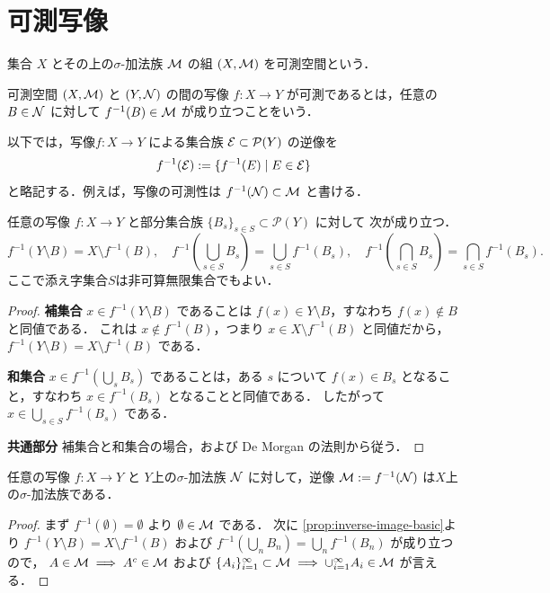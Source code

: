 \section{可測写像}

\begin{definition}[可測空間]\label{def:measurable-space}
集合 $X$ とその上の$\sigma$-加法族 $\mathcal M$ の組
$(X,\mathcal M)$
を可測空間という．
\end{definition}

\begin{definition}[可測写像]\label{def:measurable-map}
可測空間 $(X,\mathcal M)$ と $(Y,\mathcal N)$ の間の写像
$f:X\to Y$ が可測であるとは，任意の $B \in \mathcal N$ に対して
$f^{-1}(B)\in \mathcal M$ が成り立つことをいう．
\end{definition}

以下では，写像$f : X \to Y$ による集合族 $\mathcal E\subset\mathcal P(Y)$ の逆像を
\[
f^{-1}(\mathcal E):=\{f^{-1}(E)\mid E\in\mathcal E\}
\]
と略記する．例えば，写像の可測性は $f^{-1}(\mathcal N) \subset \mathcal M$ と書ける．

\begin{proposition}[逆像の基本性質]\label{prop:inverse-image-basic}
任意の写像 $f:X\to Y$ と部分集合族 $\{B_s\}_{s\in S}\subset \mathcal P(Y)$ に対して
次が成り立つ．
\[
f^{-1}(Y\setminus B)
=X\setminus f^{-1}(B),\quad
f^{-1}\left(\bigcup_{s\in S}B_s\right)
=\bigcup_{s\in S}f^{-1}(B_s),\quad
f^{-1}\left(\bigcap_{s\in S}B_s\right)
=\bigcap_{s\in S}f^{-1}(B_s).
\]
ここで添え字集合$S$は非可算無限集合でもよい．
\end{proposition}
\begin{proof}
\textbf{補集合}\quad
$x\in f^{-1}(Y\setminus B)$ であることは
$f(x)\in Y\setminus B$，すなわち $f(x)\notin B$ と同値である．
これは $x\notin f^{-1}(B)$，つまり $x\in X\setminus f^{-1}(B)$ と同値だから，
$f^{-1}(Y\setminus B)=X\setminus f^{-1}(B)$ である．

\textbf{和集合}\quad
$x\in f^{-1}(\bigcup_s B_s)$ であることは，ある $s$ について
$f(x)\in B_s$ となること，すなわち $x\in f^{-1}(B_s)$ となることと同値である．
したがって $x\in \bigcup_{s\in S}f^{-1}(B_s)$ である．

\textbf{共通部分}\quad
補集合と和集合の場合，および De Morgan の法則から従う．
\end{proof}

\begin{proposition} \label{prop:inverse-image-sigma-algebra}
任意の写像 $f: X \to Y$ と $Y$上の$\sigma$-加法族 $\mathcal N$ に対して，逆像 $\mathcal M := f^{-1}(\mathcal N)$ は$X$上の$\sigma$-加法族である．
\end{proposition}
\begin{proof}
    まず $f^{-1}(\emptyset) = \emptyset$ より $\emptyset \in \mathcal M$ である．
    次に 
    \cref{prop:inverse-image-basic}より
$f^{-1}(Y\setminus B)=X\setminus f^{-1}(B)$ および
$f^{-1}(\bigcup_n B_n)=\bigcup_n f^{-1}(B_n)$ が成り立つので，
$A \in \mathcal M \implies A^c \in \mathcal M$ および $\{A_i\}_{i=1}^\infty \subset \mathcal M \implies \cup_{i=1}^\infty A_i \in \mathcal M$ が言える．
\end{proof}

